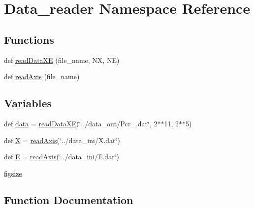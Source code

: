 \hypertarget{namespaceData__reader}{}\section{Data\+\_\+reader Namespace Reference}
\label{namespaceData__reader}
\subsection*{Functions}
\begin{DoxyCompactItemize}
\item 
def \hyperlink{namespaceData__reader_a868131ea6f864c92c46f238396b1299b}{read\+Data\+XE} (file\+\_\+name, NX, NE)
\item 
def \hyperlink{namespaceData__reader_a25f545e44fef1e7847d2b4d7cfef6a89}{read\+Axis} (file\+\_\+name)
\end{DoxyCompactItemize}
\subsection*{Variables}
\begin{DoxyCompactItemize}
\item 
def \hyperlink{namespaceData__reader_a6deb6bef39c1b18de8cd2a0641051e59}{data} = \hyperlink{namespaceData__reader_a868131ea6f864c92c46f238396b1299b}{read\+Data\+XE}(\char`\"{}../data\+\_\+out/Pcr\+\_.\+dat\char`\"{}, 2$\ast$$\ast$11, 2$\ast$$\ast$5)
\item 
def \hyperlink{namespaceData__reader_acd1bcfe63b551d6fd971c84f4542222e}{X} = \hyperlink{namespaceData__reader_a25f545e44fef1e7847d2b4d7cfef6a89}{read\+Axis}(\char`\"{}../data\+\_\+ini/X.\+dat\char`\"{})
\item 
def \hyperlink{namespaceData__reader_a701bfdb99cb202b34e585ac904282a44}{E} = \hyperlink{namespaceData__reader_a25f545e44fef1e7847d2b4d7cfef6a89}{read\+Axis}(\char`\"{}../data\+\_\+ini/E.\+dat\char`\"{})
\item 
\hyperlink{namespaceData__reader_afaa0dc6600cad3c49b6b7247fb51ef17}{figsize}
\end{DoxyCompactItemize}


\subsection{Function Documentation}
\mbox{\label{namespaceData__reader_a25f545e44fef1e7847d2b4d7cfef6a89}} 
